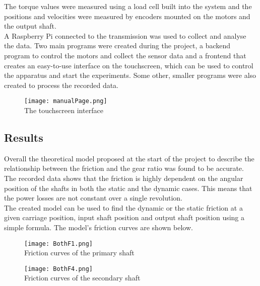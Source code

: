\documentclass[12pt]{article}
\begin{document}
The torque values were measured using a load cell built into the system and the positions and velocities were measured by encoders mounted on the motors and the output shaft.\\

A Raspberry Pi connected to the transmission was used to collect and analyse the data. Two main programs were created during the project, a backend program to control the motors and collect the sensor data and a frontend that creates an easy-to-use interface on the touchscreen, which can be used to control the apparatus and start the experiments. Some other, smaller programs were also created to process the recorded data.
\clearpage
\begin{figure}[h]
    \centering
    \texttt{[image: manualPage.png]}
    \\ The touchscreen interface
\end{figure}

\subsection*{Results}
Overall the theoretical model proposed at the start of the project to describe the relationship between the friction and the gear ratio was found to be accurate. The recorded data shows that the friction is highly dependent on the angular position of the shafts in both the static and the dynamic cases. This means that the power losses are not constant over a single revolution. \\

The created model can be used to find the dynamic or the static friction at a given carriage position, input shaft position and output shaft position using a simple formula. The model's friction curves are shown below.

\begin{figure}[!h]
    \centering
    \begin{minipage}{0.49\textwidth}       
         \texttt{[image: BothF1.png]}
         \centering
         \\Friction curves of the primary shaft
    \end{minipage}
    \begin{minipage}{0.49\textwidth}       
         \texttt{[image: BothF4.png]}
         \centering
         \\Friction curves of the secondary shaft
    \end{minipage}

\end{figure}
\end{document}
